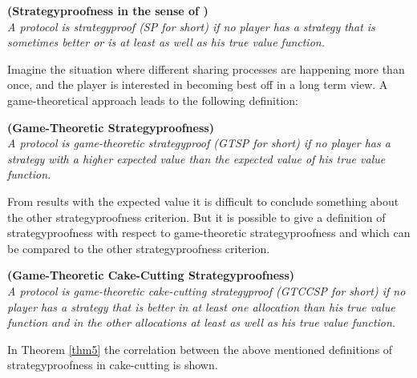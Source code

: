 \begin{defi}{\textbf{(Strategyproofness in the sense of \cite{note})}}\\
\emph{A protocol is \emph{strategyproof} (SP for short) if no player has a strategy that is sometimes better or is at least as well as his true value function.}
\end{defi}
Imagine the situation where different sharing processes are happening more than once, and the player is interested in becoming best off in a long term view. A game-theoretical approach leads to the following definition:
\begin{defi}{\textbf{(Game-Theoretic Strategyproofness)}}\\
\emph{A protocol is \emph{game-theoretic strategyproof} (GTSP for short) if no player has a strategy with a higher expected value than the expected value of his true value function.}
\end{defi}

From results with the expected value it is difficult to conclude something about the other strategyproofness criterion. But it is possible to give a definition of strategyproofness with respect to game-theoretic strategyproofness and which can be compared to the other strategyproofness criterion.
\begin{defi}{\textbf{(Game-Theoretic Cake-Cutting Strategyproofness)}}\\
\emph{A protocol is \emph{game-theoretic cake-cutting strategyproof} (GTCCSP for short) if no player has a strategy that is better in at least one allocation than his true value function and in the other allocations at least as well as his true value function.}
\end{defi}

In Theorem \ref{thm5} the correlation between the above mentioned definitions of strategyproofness in cake-cutting is shown.

